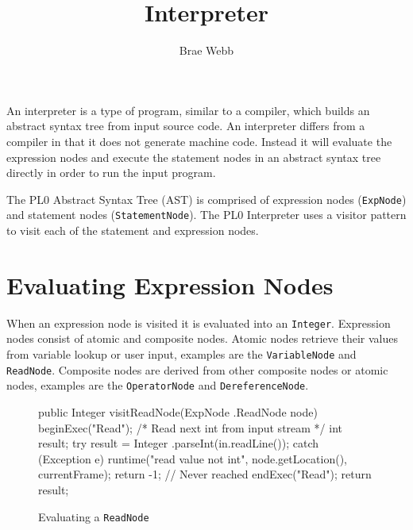\documentclass[a4paper,twoside,twocolumn]{article}
\begin{document}
\thispagestyle{empty}
\title{\vspace*{-3cm}Interpreter}
\author{Brae Webb}
\maketitle
\pagestyle{myheadings}
\vspace*{-4ex}

An interpreter is a type of program, similar to a compiler, which builds an
abstract syntax tree from input source code. An interpreter differs from a
compiler in that it does not generate machine code. Instead it will evaluate
the expression nodes and execute the statement nodes in an abstract syntax tree
directly in order to run the input program.


The PL0 Abstract Syntax Tree (AST) is comprised of expression nodes
(\texttt{ExpNode}) and statement nodes (\texttt{StatementNode}). The PL0
Interpreter uses a visitor pattern to visit each of the statement and expression
nodes.

\section{Evaluating Expression Nodes}\label{section:expressions}
When an expression node is visited it is evaluated into an \texttt{Integer}.
Expression nodes consist of atomic and composite nodes. Atomic nodes retrieve
their values from variable lookup or user input, examples are the 
\texttt{VariableNode} and \texttt{ReadNode}. Composite nodes are derived from
other composite nodes or atomic nodes, examples are the \texttt{OperatorNode}
and \texttt{DereferenceNode}.


\begin{figure}[H]
\begin{java}
public Integer visitReadNode(ExpNode
        .ReadNode node) {
    beginExec("Read");
    /* Read next int from input stream */
    int result;
    try {
        result = Integer
                .parseInt(in.readLine());
    } catch (Exception e) {
        runtime("read value not int",
                node.getLocation(),
                currentFrame);
        return -1; // Never reached
    }
    endExec("Read");
    return result;
}
\end{java}
\caption{Evaluating a \texttt{ReadNode}}\label{figure:readnode}
\end{figure}
\end{document}

